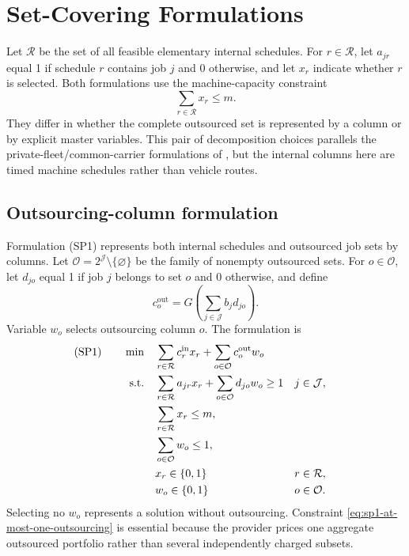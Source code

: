 \section{Set-Covering Formulations}\label{sec:formulations}

Let $\mathcal R$ be the set of all feasible elementary internal schedules. For
$r\in\mathcal R$, let $a_{jr}$ equal 1 if schedule $r$ contains job $j$ and 0
otherwise, and let $x_r$ indicate whether $r$ is selected. Both formulations use
the machine-capacity constraint
\begin{equation}
    \sum_{r\in\mathcal R}x_r\le m.
    \label{eq:machine-capacity}
\end{equation}
They differ in whether the complete outsourced set is represented by a column or
by explicit master variables. This pair of decomposition choices parallels the
private-fleet/common-carrier formulations of \citet{dabia2019rich}, but the
internal columns here are timed machine schedules rather than vehicle routes.

\subsection{Outsourcing-column formulation}
\label{subsec:sp1}

Formulation \textup{(SP1)} represents both internal schedules and outsourced job
sets by columns. Let
$\mathcal O=2^{\mathcal J}\setminus\{\varnothing\}$ be the family of nonempty
outsourced sets. For $o\in\mathcal O$, let $d_{jo}$ equal 1 if job $j$ belongs to
set $o$ and 0 otherwise, and define
\begin{equation}
    c_o^{\mathrm{out}}
    =
    G\left(\sum_{j\in\mathcal J}b_jd_{jo}\right).
    \label{eq:outsourcing-column-cost}
\end{equation}
Variable $w_o$ selects outsourcing column $o$. The formulation is
\begin{align}
\textup{(SP1)}\qquad
\min\quad
    &\sum_{r\in\mathcal R}c_r^{\mathrm{in}}x_r
     +\sum_{o\in\mathcal O}c_o^{\mathrm{out}}w_o
     \label{eq:sp1-obj}\\
\text{s.t.}\quad
    &\sum_{r\in\mathcal R}a_{jr}x_r
     +\sum_{o\in\mathcal O}d_{jo}w_o\ge1
     &&j\in\mathcal J, \label{eq:sp1-cover}\\
    &\sum_{r\in\mathcal R}x_r\le m,
     \label{eq:sp1-machines}\\
    &\sum_{o\in\mathcal O}w_o\le1,
     \label{eq:sp1-at-most-one-outsourcing}\\
    &x_r\in\{0,1\}
     &&r\in\mathcal R,\\
    &w_o\in\{0,1\}
     &&o\in\mathcal O.
\end{align}
Selecting no $w_o$ represents a solution without outsourcing.
Constraint \eqref{eq:sp1-at-most-one-outsourcing} is essential because the
provider prices one aggregate outsourced portfolio rather than several
independently charged subsets.

